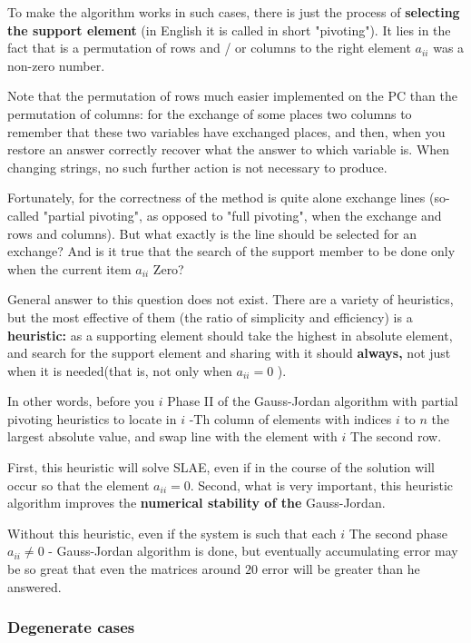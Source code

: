 To make the algorithm works in such cases, there is just the process of \textbf{selecting the support element} (in English it is called in short "pivoting"). It lies in the fact that is a permutation of rows and / or columns to the right element $a_ {ii}$ was a non-zero number.

Note that the permutation of rows much easier implemented on the PC than the permutation of columns: for the exchange of some places two columns to remember that these two variables have exchanged places, and then, when you restore an answer correctly recover what the answer to which variable is. When changing strings, no such further action is not necessary to produce.

Fortunately, for the correctness of the method is quite alone exchange lines (so-called "partial pivoting", as opposed to "full pivoting", when the exchange and rows and columns). But what exactly is the line should be selected for an exchange? And is it true that the search of the support member to be done only when the current item $a_ {ii}$ Zero?

General answer to this question does not exist. There are a variety of heuristics, but the most effective of them (the ratio of simplicity and efficiency) is a \textbf{heuristic:} as a supporting element should take the highest in absolute element, and search for the support element and sharing with it should \textbf{always,} not just when it is needed(that is, not only when $a_ {ii} = 0$ ).

In other words, before you $i$ Phase II of the Gauss-Jordan algorithm with partial pivoting heuristics to locate in $i$ -Th column of elements with indices $i$ to $n$ the largest absolute value, and swap line with the element with $i$ The second row.

First, this heuristic will solve SLAE, even if in the course of the solution will occur so that the element $a_ {ii} = 0$. Second, what is very important, this heuristic algorithm improves the \textbf{numerical stability of the} Gauss-Jordan.

Without this heuristic, even if the system is such that each $i$ The second phase $a_ {ii} \ne 0$ - Gauss-Jordan algorithm is done, but eventually accumulating error may be so great that even the matrices around $20$ error will be greater than he answered.

\subsubsection{ Degenerate cases }

